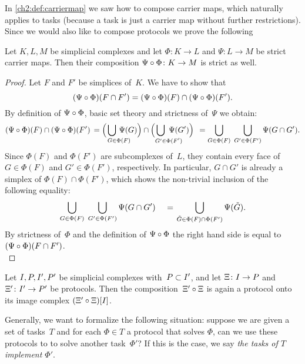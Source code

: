 In \cref{ch2:def:carriermap} we saw how to compose carrier maps,
which naturally applies to tasks (because a task is just a carrier
map without further restrictions). Since we would also like to compose
protocols we prove the following

\begin{thLemma}
    Let $K,L,M$ be simplicial complexes and let $\Phi\colon K\to L$
    and $\Psi\colon L\to M$ be strict carrier maps.
    Then their composition $\Psi\after\Phi\colon K\to M$ is strict as well.
\end{thLemma}

\begin{proof}
    Let $F$ and $F'$ be simplices of~$K$. We have to show that
    \[ (\Psi\after\Phi)(F\cap F')
        = (\Psi\after\Phi)(F) \cap (\Psi\after\Phi)(F')
    . \]
    By definition of $\Psi\after\Phi$, basic set theory and strictness
    of~$\Psi$ we obtain:
    \[ (\Psi\after\Phi)(F) \cap (\Psi\after\Phi)(F')
        \,=
        \Bigl( \mkern2mu \bigcup_{G\in\mathrlap{\Phi(F)}} \, \Psi(G) \Bigr)
            \cap \Bigl( \bigcup_{G'\in\mathrlap{\Phi(F')}} \, \Psi(G') \Bigr)
        \mkern8mu=
        \bigcup_{G\in\Phi(F)} \; \bigcup_{G'\in\Phi(F')}
            \Psi(G\cap G')
    . \]
    Since $\Phi(F)$ and $\Phi(F')$ are subcomplexes of~$L$, they contain every
    face of $G\in\Phi(F)$ and $G'\in\Phi(F')$, respectively. In particular,
    $G\cap G'$ is already a simplex of $\Phi(F)\cap\Phi(F')$, which shows the
    non-trivial inclusion of the following equality:
    \[ \bigcup_{G\in\Phi(F)} \; \bigcup_{G'\in\Phi(F')} \Psi(G\cap G')
        \quad\mkern2mu=\mkern2mu
        \bigcup_{\tilde G\in\Phi(F)\cap \Phi(F')} \Psi(\tilde G)
    . \]
    By strictness of~$\Phi$ and the definition of $\Psi\after\Phi$ the right
    hand side is equal to $(\Psi\after\Phi)(F\cap F')$.
    \\
\end{proof}

\begin{thCorollary}
    Let $I,P,I',P'$ be simplicial complexes with~$P\subset I'$,
    and let $\Xi\colon I\to P$ and $\Xi'\colon I'\to P'$ be protocols.
    Then the composition~$\Xi'\after\Xi$ is again
    a protocol onto its image complex $(\Xi'\after\Xi)[\cI]$.
\end{thCorollary}

Generally, we want to formalize the following situation: suppose we are
given a set of tasks~$T$ and for each $\Phi\in T$ a protocol that
solves $\Phi$, can we use these protocols to to solve another task~$\Phi'$? If
this is the case, we say \emph{the tasks of $T$ implement $\Phi'$}.

